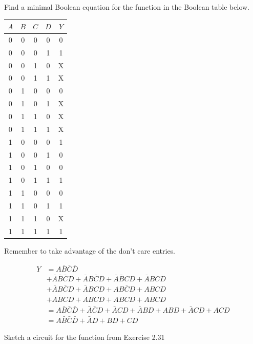 \documentclass[12pt]{article}
\newenvironment{ex}[2][Exercise]{\begin{trivlist}
		\item[\hskip \labelsep {\bfseries #1}\hskip \labelsep {\bfseries #2.}]}{\end{trivlist}}
\newenvironment{sol}[1][Solution]{\begin{trivlist}
		\item[\hskip \labelsep {\bfseries #1:}]}{\end{trivlist}}
\begin{document}
\begin{ex}{2.31}
	Find a minimal Boolean equation for the function
	in the Boolean table below.
	
		\begin{center}
		\begin{tabular}{cccc|c}
			$A$ & $B$ & $C$ & $D$ & $Y$\\
			\hline
			0 & 0 & 0 & 0 & 0\\
			0 & 0 & 0 & 1 & 1\\
			0 & 0 & 1 & 0 & X\\
			0 & 0 & 1 & 1 & X\\
			0 & 1 & 0 & 0 & 0\\
			0 & 1 & 0 & 1 & X\\
			0 & 1 & 1 & 0 & X\\
			0 & 1 & 1 & 1 & X\\
			1 & 0 & 0 & 0 & 1\\
			1 & 0 & 0 & 1 & 0\\
			1 & 0 & 1 & 0 & 0\\
			1 & 0 & 1 & 1 & 1\\
			1 & 1 & 0 & 0 & 0\\
			1 & 1 & 0 & 1 & 1\\
			1 & 1 & 1 & 0 & X\\
			1 & 1 & 1 & 1 & 1\\
		\end{tabular}
	\end{center}
	Remember to take advantage of the don't care entries.
\end{ex}

\begin{sol}
	\begin{align*}
		Y&=A\bar{B}\bar{C}\bar{D}\\
		&+\bar{A}\bar{B}\bar{C}D+\bar{A}B\bar{C}D+\bar{A}\bar{B}CD+\bar{A}BCD\\
		&+\bar{A}B\bar{C}D+\bar{A}BCD+AB\bar{C}D+ABCD\\
		&+\bar{A}\bar{B}CD+\bar{A}BCD+ABCD+A\bar{B}CD\\
		&=A\bar{B}\bar{C}\bar{D}
		+\bar{A}\bar{C}D+\bar{A}CD
		+\bar{A}BD+ABD
		+\bar{A}CD+ACD\\
		&=A\bar{B}\bar{C}\bar{D}
		+\bar{A}D+BD+CD
	\end{align*}
\end{sol}

\begin{ex}{2.32}
	Sketch a circuit for the function from Exercise 2.31
\end{ex}
 
\end{document}
